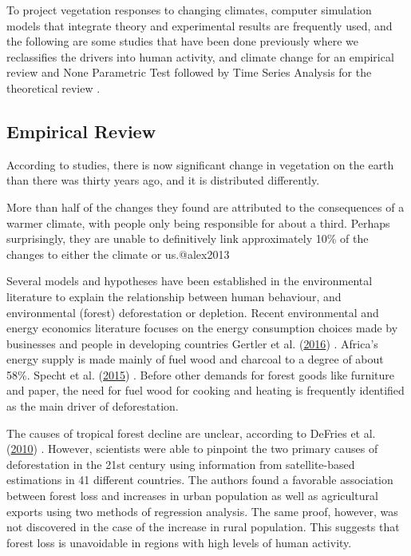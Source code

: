 \documentclass[
  onepage,
  openany]{scrbook}
\begin{document}
To project vegetation responses to changing climates, computer
simulation models that integrate theory and experimental results are
frequently used, and the following are some studies that have been done
previously where we reclassifies the drivers into human activity, and
climate change for an empirical review and None Parametric Test followed
by Time Series Analysis for the theoretical review .

\hypertarget{empirical-review}{%
\subsection{Empirical Review}\label{empirical-review}}

According to studies, there is now significant change in vegetation on
the earth than there was thirty years ago, and it is distributed
differently.

More than half of the changes they found are attributed to the
consequences of a warmer climate, with people only being responsible for
about a third. Perhaps surprisingly, they are unable to definitively
link approximately 10\% of the changes to either the climate or
us.@alex2013

Several models and hypotheses have been established in the environmental
literature to explain the relationship between human behaviour, and
environmental (forest) deforestation or depletion. Recent environmental
and energy economics literature focuses on the energy consumption
choices made by businesses and people in developing countries Gertler et
al. (\protect\hyperlink{ref-gertler2016}{2016}) . Africa's energy supply
is made mainly of fuel wood and charcoal to a degree of about 58\%.
Specht et al. (\protect\hyperlink{ref-specht2015}{2015}) . Before other
demands for forest goods like furniture and paper, the need for fuel
wood for cooking and heating is frequently identified as the main driver
of deforestation.

The causes of tropical forest decline are unclear, according to DeFries
et al. (\protect\hyperlink{ref-defries2010}{2010}) . However, scientists
were able to pinpoint the two primary causes of deforestation in the
21st century using information from satellite-based estimations in 41
different countries. The authors found a favorable association between
forest loss and increases in urban population as well as agricultural
exports using two methods of regression analysis. The same proof,
however, was not discovered in the case of the increase in rural
population. This suggests that forest loss is unavoidable in regions
with high levels of human activity.
\end{document}
